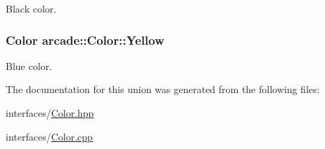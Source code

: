 Black color. 

\hypertarget{unionarcade_1_1_color_aa437de4029652dba87b0b64ca488f8ff}{
\subsubsection[{Yellow}]{ {\bf Color} arcade\-::\-Color\-::\-Yellow\hspace{0.3cm}{\ttfamily [static]}}}\label{unionarcade_1_1_color_aa437de4029652dba87b0b64ca488f8ff}


Blue color. 



The documentation for this union was generated from the following files\-:\begin{DoxyCompactItemize}
\item 
interfaces/\hyperlink{interfaces_2_color_8hpp}{Color.\-hpp}\item 
interfaces/\hyperlink{_color_8cpp}{Color.\-cpp}\end{DoxyCompactItemize}
